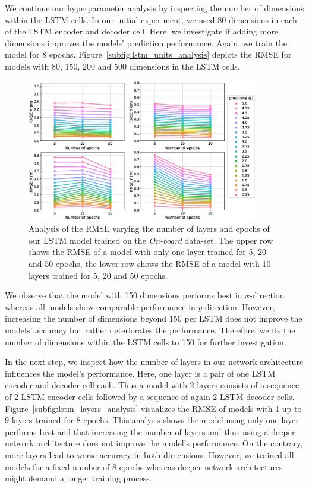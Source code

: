 We continue our hyperparameter analysis by inspecting the number of dimensions within the \ac{LSTM} cells.
In our initial experiment, we used \num{80} dimensions in each of the \ac{LSTM} encoder and decoder cell.
Here, we investigate if adding more dimensions improves the models' prediction performance.
Again, we train the model for \num{8} epochs.
Figure~\ref{subfig:lstm_units_analysis} depicts the \ac{RMSE} for models with \num{80}, \num{150}, \num{200} and \num{500} dimensions in the \ac{LSTM} cells.
\begin{figure}[t!]
  \centering
  \includegraphics[width=0.9\textwidth]{imgs/lstm_layers_epochs_analysis.eps}
  \caption{Analysis of the \ac{RMSE} varying the number of layers and epochs of our \ac{LSTM} model trained on the \emph{On-board} data-set. The upper row shows the \ac{RMSE} of a model with only one layer trained for \num{5}, \num{20} and \num{50} epochs, the lower row shows the \ac{RMSE} of a model with \num{10} layers trained for \num{5}, \num{20} and \num{50} epochs.}
  \label{fig:lstm_layers_epochs_analysis}
\end{figure}
We observe that the model with \num{150} dimensions performs best in $x$-direction whereas all models show comparable performance in $y$-direction.
However, increasing the number of dimensions beyond \num{150} per \ac{LSTM} does not improve the models' accuracy but rather deteriorates the performance.
Therefore, we fix the number of dimensions within the \ac{LSTM} cells to \num{150} for further investigation.

In the next step, we inspect how the number of layers in our network architecture influences the model's performance.
Here, one layer is a pair of one \ac{LSTM} encoder and decoder cell each.
Thus a model with \num{2} layers consists of a sequence of \num{2} \ac{LSTM} encoder cells followed by a sequence of again \num{2} \ac{LSTM} decoder cells.
Figure~\ref{subfig:lstm_layers_analysis} visualizes the \ac{RMSE} of models with \num{1} up to \num{9} layers trained for \num{8} epochs.
This analysis shows the model using only one layer performs best and that increasing the number of layers and thus using a deeper network architecture does not improve the model's performance.
On the contrary, more layers lead to worse accuracy in both dimensions.
However, we trained all models for a fixed number of \num{8} epochs whereas deeper network architectures might demand a longer training process.

